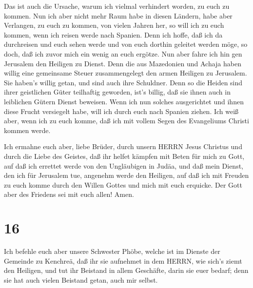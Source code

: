  Das ist auch die Ursache, warum ich vielmal verhindert
worden, zu euch zu kommen.  Nun ich aber nicht mehr Raum
habe in diesen Ländern, habe aber Verlangen, zu euch zu kommen, von
vielen Jahren her,  so will ich zu euch kommen, wenn ich
reisen werde nach Spanien. Denn ich hoffe, daß ich da durchreisen und
euch sehen werde und von euch dorthin geleitet werden möge, so doch, daß
ich zuvor mich ein wenig an euch ergötze.  Nun aber fahre
ich hin gen Jerusalem den Heiligen zu Dienst.  Denn die aus
Mazedonien und Achaja haben willig eine gemeinsame Steuer zusammengelegt
den armen Heiligen zu Jerusalem.  Sie haben's willig getan,
und sind auch ihre Schuldner. Denn so die Heiden sind ihrer geistlichen
Güter teilhaftig geworden, ist's billig, daß sie ihnen auch in
leiblichen Gütern Dienst beweisen.  Wenn ich nun solches
ausgerichtet und ihnen diese Frucht versiegelt habe, will ich durch euch
nach Spanien ziehen.  Ich weiß aber, wenn ich zu euch
komme, daß ich mit vollem Segen des Evangeliums Christi kommen werde.

 Ich ermahne euch aber, liebe Brüder, durch unsern HERRN
Jesus Christus und durch die Liebe des Geistes, daß ihr helfet kämpfen
mit Beten für mich zu Gott,  auf daß ich errettet werde von
den Ungläubigen in Judäa, und daß mein Dienst, den ich für Jerusalem
tue, angenehm werde den Heiligen,  auf daß ich mit Freuden
zu euch komme durch den Willen Gottes und mich mit euch erquicke.
 Der Gott aber des Friedens sei mit euch allen! Amen.

\hypertarget{section-15}{%
\section{16}\label{section-15}}

 Ich befehle euch aber unsere Schwester Phöbe, welche ist im
Dienste der Gemeinde zu Kenchreä,  daß ihr sie aufnehmet in
dem HERRN, wie sich's ziemt den Heiligen, und tut ihr Beistand in allem
Geschäfte, darin sie euer bedarf; denn sie hat auch vielen Beistand
getan, auch mir selbst.

